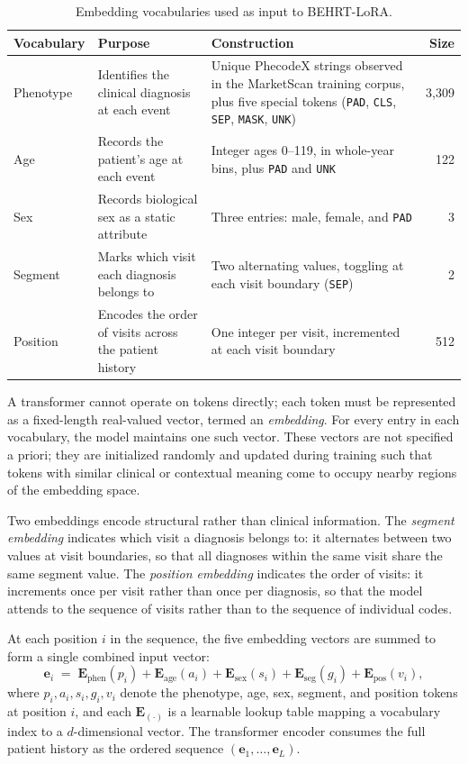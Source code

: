 \documentclass[12pt]{article}
\begin{document}
\begin{table}[h!]
\centering
\caption{Embedding vocabularies used as input to BEHRT-LoRA.}
\label{tab:vocabularies}
\begin{tabular}{p{2.5cm} p{3.5cm} p{4.5cm} r}
\toprule
Vocabulary & Purpose & Construction & Size \\
\midrule
Phenotype &
Identifies the clinical diagnosis at each event &
Unique PhecodeX strings observed in the MarketScan training corpus, plus five special tokens (\texttt{PAD}, \texttt{CLS}, \texttt{SEP}, \texttt{MASK}, \texttt{UNK}) &
3{,}309 \\[6pt]
Age &
Records the patient's age at each event &
Integer ages 0--119, in whole-year bins, plus \texttt{PAD} and \texttt{UNK} &
122 \\[6pt]
Sex &
Records biological sex as a static attribute &
Three entries: male, female, and \texttt{PAD} &
3 \\[6pt]
Segment &
Marks which visit each diagnosis belongs to &
Two alternating values, toggling at each visit boundary (\texttt{SEP}) &
2 \\[6pt]
Position &
Encodes the order of visits across the patient history &
One integer per visit, incremented at each visit boundary &
512 \\
\bottomrule
\end{tabular}
\end{table}

A transformer cannot operate on tokens directly; each token must be represented as a fixed-length real-valued vector, termed an \textit{embedding}. For every entry in each vocabulary, the model maintains one such vector. These vectors are not specified a priori; they are initialized randomly and updated during training such that tokens with similar clinical or contextual meaning come to occupy nearby regions of the embedding space.

Two embeddings encode structural rather than clinical information. The \textit{segment embedding} indicates which visit a diagnosis belongs to: it alternates between two values at visit boundaries, so that all diagnoses within the same visit share the same segment value. The \textit{position embedding} indicates the order of visits: it increments once per visit rather than once per diagnosis, so that the model attends to the sequence of visits rather than to the sequence of individual codes.

At each position $i$ in the sequence, the five embedding vectors are summed to form a single combined input vector:
\begin{equation}
\mathbf{e}_i \;=\; \mathbf{E}_{\mathrm{phen}}(p_i) + \mathbf{E}_{\mathrm{age}}(a_i) + \mathbf{E}_{\mathrm{sex}}(s_i) + \mathbf{E}_{\mathrm{seg}}(g_i) + \mathbf{E}_{\mathrm{pos}}(v_i),
\label{eq:embedding-sum}
\end{equation}
where $p_i, a_i, s_i, g_i, v_i$ denote the phenotype, age, sex, segment, and position tokens at position $i$, and each $\mathbf{E}_{(\cdot)}$ is a learnable lookup table mapping a vocabulary index to a $d$-dimensional vector. The transformer encoder consumes the full patient history as the ordered sequence $(\mathbf{e}_1, \dots, \mathbf{e}_L)$.
\end{document}
